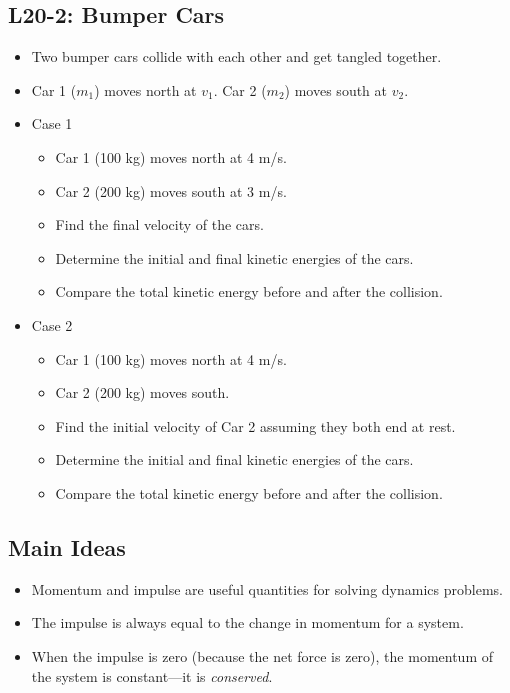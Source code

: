 \documentclass[]{article}
\newcommand{\Week}{20}
\begin{document}
\begin{PresentSpace}
\vspace{-10pt}
\section*{L\Week-2: Bumper Cars}
\vspace{-10pt}
\begin{itemize}
	\item Two bumper cars collide with each other and get tangled together.
	\item Car 1 ($m_{1}$) moves north at $v_{1}$. Car 2 ($m_{2}$) moves south at $v_{2}$.
\end{itemize}
\begin{multicols}{2}
	\begin{itemize}
		\item Case 1
		\begin{itemize}
			\large
			\item Car 1 (100 kg) moves north at 4 m/s.
			\item Car 2 (200 kg) moves south at 3 m/s.
			\item Find the final velocity of the cars.
			\item Determine the initial and final kinetic energies of the cars.
			\item Compare the total kinetic energy before and after the collision.
		\end{itemize}
		\item Case 2
		\begin{itemize}
			\large
			\item Car 1 (100 kg) moves north at 4 m/s.
			\item Car 2 (200 kg) moves south.
			\item Find the initial velocity of Car 2 assuming they both end at rest.
			\item Determine the initial and final kinetic energies of the cars.
			\item Compare the total kinetic energy before and after the collision.
		\end{itemize}
	\end{itemize}
\end{multicols}
\end{PresentSpace}
\newpage
\begin{TeacherMargin}
	
\end{TeacherMargin}
\begin{PresentSpace}
\section*{Main Ideas}
\begin{itemize}
	\item Momentum and impulse are useful quantities for solving dynamics problems.
	\item The impulse is always equal to the change in momentum for a system.
	\item When the impulse is zero (because the net force is zero), the momentum of the system is constant---it is \textit{conserved}.
\end{itemize}
\end{PresentSpace}
\end{document}
